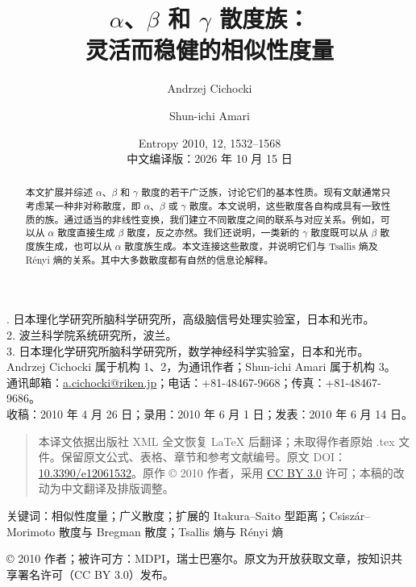 \documentclass[UTF8,fontset=none,11pt,a4paper]{ctexart}
\title{$\alpha$、$\beta$ 和 $\gamma$ 散度族：\\灵活而稳健的相似性度量}
\author{Andrzej Cichocki \and Shun-ichi Amari}
\date{Entropy 2010, 12, 1532--1568\\中文编译版：2026 年 10 月 15 日}
\begin{document}
\maketitle
{\small{}. 日本理化学研究所脑科学研究所，高级脑信号处理实验室，日本和光市。\\2. 波兰科学院系统研究所，波兰。\\3. 日本理化学研究所脑科学研究所，数学神经科学实验室，日本和光市。\\Andrzej Cichocki 属于机构 1、2，为通讯作者；Shun-ichi Amari 属于机构 3。\\通讯邮箱：\href{mailto:a.cichocki@riken.jp}{a.cichocki@riken.jp}；电话：+81-48467-9668；传真：+81-48467-9686。\\收稿：2010 年 4 月 26 日；录用：2010 年 6 月 1 日；发表：2010 年 6 月 14 日。\par}
\begin{quote}\small 本译文依据出版社 XML 全文恢复 LaTeX 后翻译；未取得作者原始 .tex 文件。保留原文公式、表格、章节和参考文献编号。原文 DOI：\href{https://doi.org/10.3390/e12061532}{10.3390/e12061532}。原作 © 2010 作者，采用 \href{https://creativecommons.org/licenses/by/3.0/}{CC BY 3.0} 许可；本稿的改动为中文翻译及排版调整。\end{quote}
\begin{abstract}
本文扩展并综述 \(\alpha\)、\(\beta\) 和 \(\gamma\) 散度的若干广泛族，讨论它们的基本性质。现有文献通常只考虑某一种非对称散度，即 \(\alpha\)、\(\beta\) 或 \(\gamma\) 散度。本文说明，这些散度各自构成具有一致性质的族。通过适当的非线性变换，我们建立不同散度之间的联系与对应关系。例如，可以从 \(\alpha\) 散度直接生成 \(\beta\) 散度，反之亦然。我们还说明，一类新的 \(\gamma\) 散度既可以从 \(\beta\) 散度族生成，也可以从 \(\alpha\) 散度族生成。本文连接这些散度，并说明它们与 Tsallis 熵及 Rényi 熵的关系。其中大多数散度都有自然的信息论解释。
\end{abstract}
\noindent 关键词：相似性度量；广义散度；扩展的 Itakura–Saito 型距离；Csiszár–Morimoto 散度与 Bregman 散度；Tsallis 熵与 Rényi 熵
\tableofcontents
\clearpage






\appendix




\bigskip\noindent\small © 2010 作者；被许可方：MDPI，瑞士巴塞尔。原文为开放获取文章，按知识共享署名许可（CC BY 3.0）发布。
\end{document}

